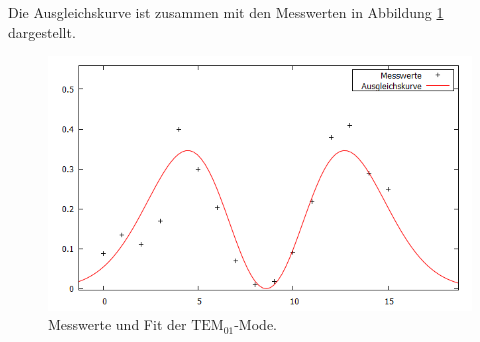 Die Ausgleichskurve ist zusammen mit den Messwerten in Abbildung \ref{mode2fit} dargestellt.
\begin{figure}[H]
  \centering
  \includegraphics[width=14cm]{bilder/TEM01.png}
  \caption{Messwerte und Fit der  $\text{TEM}_{01}$-Mode.}
  \label{mode2fit}
\end{figure}
